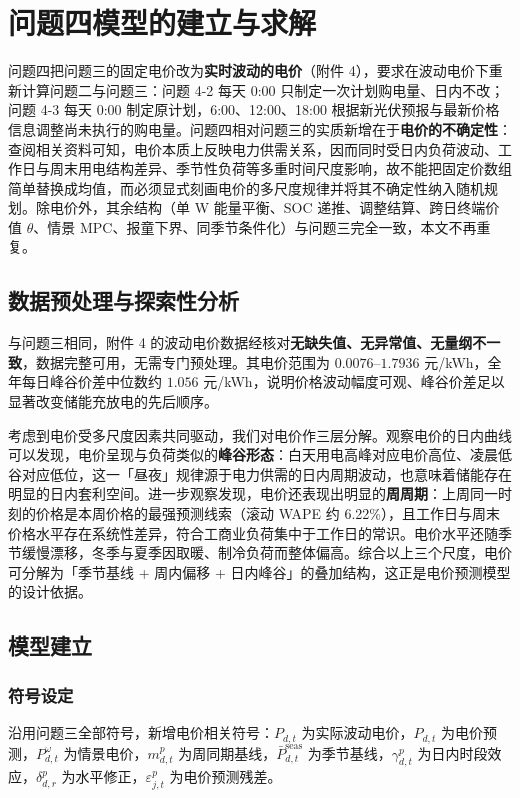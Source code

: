 \section{问题四模型的建立与求解}

问题四把问题三的固定电价改为\textbf{实时波动的电价}（附件 4），要求在波动电价下重新计算问题二与问题三：问题 4-2 每天 0:00 只制定一次计划购电量、日内不改；问题 4-3 每天 0:00 制定原计划，6:00、12:00、18:00 根据新光伏预报与最新价格信息调整尚未执行的购电量。问题四相对问题三的实质新增在于\textbf{电价的不确定性}：查阅相关资料可知，电价本质上反映电力供需关系，因而同时受日内负荷波动、工作日与周末用电结构差异、季节性负荷等多重时间尺度影响，故不能把固定价数组简单替换成均值，而必须显式刻画电价的多尺度规律并将其不确定性纳入随机规划。除电价外，其余结构（单 W 能量平衡、SOC 递推、调整结算、跨日终端价值 $\theta$、情景 MPC、报童下界、同季节条件化）与问题三完全一致，本文不再重复。

\subsection{数据预处理与探索性分析}

与问题三相同，附件 4 的波动电价数据经核对\textbf{无缺失值、无异常值、无量纲不一致}，数据完整可用，无需专门预处理。其电价范围为 $0.0076$--$1.7936$ 元/kWh，全年每日峰谷价差中位数约 $1.056$ 元/kWh，说明价格波动幅度可观、峰谷价差足以显著改变储能充放电的先后顺序。

考虑到电价受多尺度因素共同驱动，我们对电价作三层分解。观察电价的日内曲线可以发现，电价呈现与负荷类似的\textbf{峰谷形态}：白天用电高峰对应电价高位、凌晨低谷对应低位，这一「昼夜」规律源于电力供需的日内周期波动，也意味着储能存在明显的日内套利空间。进一步观察发现，电价还表现出明显的\textbf{周周期}：上周同一时刻的价格是本周价格的最强预测线索（滚动 WAPE 约 6.22\%），且工作日与周末价格水平存在系统性差异，符合工商业负荷集中于工作日的常识。电价水平还随季节缓慢漂移，冬季与夏季因取暖、制冷负荷而整体偏高。综合以上三个尺度，电价可分解为「季节基线 + 周内偏移 + 日内峰谷」的叠加结构，这正是电价预测模型的设计依据。

\subsection{模型建立}

\subsubsection{符号设定}

沿用问题三全部符号，新增电价相关符号：$P_{d,t}$ 为实际波动电价，$\widehat P_{d,t}$ 为电价预测，$P^\omega_{d,t}$ 为情景电价，$m^p_{d,t}$ 为周同期基线，$\bar P^{\mathrm{seas}}_{d,t}$ 为季节基线，$\gamma^p_{d,t}$ 为日内时段效应，$\delta^p_{d,r}$ 为水平修正，$\varepsilon^p_{j,t}$ 为电价预测残差。

